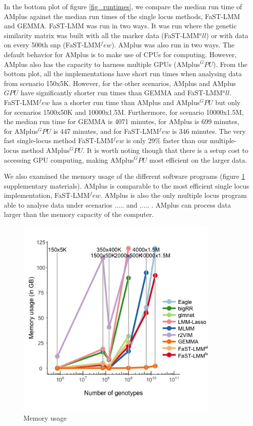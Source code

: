 \documentclass[12pt]{article}
\begin{document}
In the bottom plot of figure \ref{fig_runtimes}, we compare the median run time of AMplus against the median run times of the single locus methods, FaST-LMM and GEMMA. 
FaST-LMM was run in two ways. It was run where the genetic similarity matrix was built with all the marker data (FaST-LMM$^all$) or with data on every 500th snp (FaST-LMM$^few$). 
AMplus was also run in two ways.  The default behavior for AMplus is to make use of CPUs for computing. However, AMplus also has the capacity to harness multiple GPUs (AMplus$^GPU$). 
From the bottom plot, all the implementations have short run times when analysing data from scenario 150x5K. However, for the other scenarios, AMplus and AMplus$GPU$ have 
significantly shorter run times than GEMMA and FaST-LMM$^all$. FaST-LMM$^few$ has a shorter run time than AMplus and AMplus$^GPU$ but only for scenarios 1500x50K and 
10000x1.5M.  Furthermore, for scenario 10000x1.5M, the median run time for GEMMA is 4071 minutes, for AMplus is 699 minutes, for AMplus$^GPU$ is 447 minutes, and for 
FaST-LMM$^few$ is 346 minutes. The very fast single-locus method FaST-LMM$^few$ is only 29\% faster than our multiple-locus method AMplus$^GPU$. It is worth noting though that 
there is a setup cost to accessing GPU computing, making AMplus$^GPU$ most efficient on the larger data. 


We also examined the memory usage of the different software programs (figure \ref{fig_memory} supplementary materials). 
AMplus is comparable to the most efficient single locus implementation, FaST-LMM$^few$. 
AMplus is also the only multiple locus program able to analyse data under scenarios ..... and ..... . 
AMplus can process data larger than the memory capacity of the computer.

\begin{figure}
\label{fig_memory}
\caption{Memory usage}
\includegraphics[width=10cm]{mem}
\end{figure}
\end{document}
